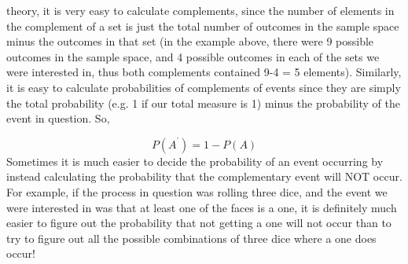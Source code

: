 theory, it is very easy to calculate complements, since the number of elements
in the complement of a set is just the total number of outcomes in the sample
space minus the outcomes in that set (in the example above, there were 9
possible outcomes in the sample space, and 4 possible outcomes in each of the
sets we were interested in, thus both complements contained 9-4 = 5 elements).
Similarly, it is easy to calculate probabilities of complements of events since
they are simply the total probability (e.g. 1 if our total measure is 1) minus the probability of the event in question. So,\par \label{m39377*eip-936}\nopagebreak\noindent{}
    \begin{equation}
    P\left({A}^{\text{'}}\right)=1-P\left(A\right)\tag{11.3}
      \end{equation}
      \label{m39377*eip-836}Sometimes it is much easier to decide the probability of an event occurring by instead calculating the probability that the complementary event will NOT occur. For example, if the process in question was rolling three dice, and the event we were interested in was that at least one of the faces is a one, it is definitely much easier to figure out the probability that not getting a one will not occur than to try to figure out all the possible combinations of three dice where a one does occur!\par \label{m39377*eip-549}\vspace{.5cm} 
      \noindent

